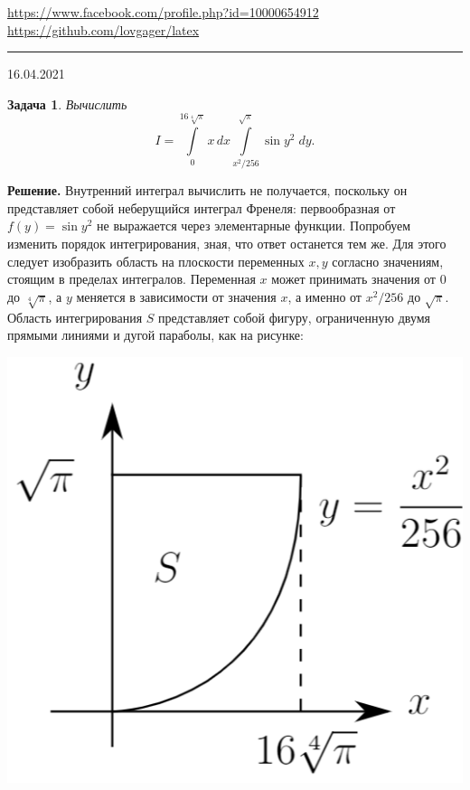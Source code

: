 \documentclass[12pt]{article}
\begin{document}


\begin{flushleft}
\url{https://www.facebook.com/profile.php?id=10000654912}
\url{https://github.com/lovgager/latex}
\end{flushleft}
\hrule 
\begin{flushright}
16.04.2021
\end{flushright}
\bigskip


\newtheorem*{task}{Задача}
\begin{task}
Вычислить
\begin{equation}\label{integral}
    I = \int\limits_0^{16\sqrt[4]{\pi}} x\,dx \int\limits_{x^2/256}^{\sqrt{\pi}} \sin{y^2}\;dy.
\end{equation}
\end{task}

\noindent\textbf{Решение.} Внутренний интеграл вычислить не получается, поскольку он представляет собой неберущийся интеграл Френеля: первообразная от $f(y)=\sin{y^2}$ не выражается через элементарные функции. Попробуем изменить порядок интегрирования, зная, что ответ останется тем же. Для этого следует изобразить область на плоскости переменных $x,y$ согласно значениям, стоящим в пределах интегралов. Переменная $x$ может принимать значения от $0$ до $\sqrt[4]{\pi}$, а $y$ меняется в зависимости от значения $x$, а именно от $x^2/256$ до $\sqrt{\pi}$. Область интегрирования $S$ представляет собой фигуру, ограниченную двумя прямыми линиями и дугой параболы, как на рисунке:
\begin{center}
\includegraphics[scale=0.25]{drawing.png}
\end{center}
\end{document}
